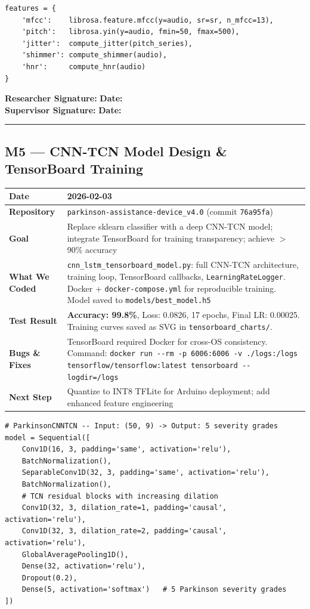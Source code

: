 \documentclass[12pt,a4paper]{article}
\makeatletter
\newcommand{\sigblock}{%
  \vspace{0.6em}
  \noindent\textbf{Researcher Signature:} \underline{\hspace{6cm}} \quad \textbf{Date:} \underline{\hspace{3cm}}\\[0.4em]
  \noindent\textbf{Supervisor Signature:} \underline{\hspace{6cm}} \quad \textbf{Date:} \underline{\hspace{3cm}}
  \vspace{0.4em}\hrule\vspace{0.6em}
}
\newenvironment{milestonetable}{%
  \begin{tcolorbox}[colback=codebg, colframe=codeframe, breakable, left=4pt, right=4pt, top=4pt, bottom=4pt]
  \begin{tabularx}{\linewidth}{@{}>{\bfseries}p{3.2cm} X@{}}
  \toprule
}{%
  \bottomrule
  \end{tabularx}
  \end{tcolorbox}
}
\newcommand{\mrow}[2]{\midrule #1 & #2 \\}
\makeatother
\begin{document}
\begin{lstlisting}[style=pythonstyle, caption={speech\_feature\_extractor.py -- Acoustic feature extraction}]
features = {
    'mfcc':    librosa.feature.mfcc(y=audio, sr=sr, n_mfcc=13),
    'pitch':   librosa.yin(y=audio, fmin=50, fmax=500),
    'jitter':  compute_jitter(pitch_series),
    'shimmer': compute_shimmer(audio),
    'hnr':     compute_hnr(audio)
}
\end{lstlisting}

\sigblock

\subsection{M5 --- CNN-TCN Model Design \& TensorBoard Training}

\begin{milestonetable}
\mrow{Date}{2026-02-03}
\mrow{Repository}{\texttt{parkinson-assistance-device\_v4.0} (commit \texttt{76a95fa})}
\mrow{Goal}{Replace sklearn classifier with a deep CNN-TCN model; integrate TensorBoard for training transparency; achieve $>$90\% accuracy}
\mrow{What We Coded}{\texttt{cnn\_lstm\_tensorboard\_model.py}: full CNN-TCN architecture, training loop, TensorBoard callbacks, \texttt{LearningRateLogger}. Docker + \texttt{docker-compose.yml} for reproducible training. Model saved to \texttt{models/best\_model.h5}}
\mrow{Test Result}{\textbf{Accuracy: 99.8\%}, Loss: 0.0826, 17 epochs, Final LR: 0.00025. Training curves saved as SVG in \texttt{tensorboard\_charts/}.}
\mrow{Bugs \& Fixes}{TensorBoard required Docker for cross-OS consistency. Command: \texttt{docker run -{}-rm -p 6006:6006 -v ./logs:/logs tensorflow/tensorflow:latest tensorboard -{}-logdir=/logs}}
\mrow{Next Step}{Quantize to INT8 TFLite for Arduino deployment; add enhanced feature engineering}
\end{milestonetable}

\begin{lstlisting}[style=pythonstyle, caption={cnn\_lstm\_tensorboard\_model.py -- CNN-TCN architecture}]
# ParkinsonCNNTCN -- Input: (50, 9) -> Output: 5 severity grades
model = Sequential([
    Conv1D(16, 3, padding='same', activation='relu'),
    BatchNormalization(),
    SeparableConv1D(32, 3, padding='same', activation='relu'),
    BatchNormalization(),
    # TCN residual blocks with increasing dilation
    Conv1D(32, 3, dilation_rate=1, padding='causal', activation='relu'),
    Conv1D(32, 3, dilation_rate=2, padding='causal', activation='relu'),
    GlobalAveragePooling1D(),
    Dense(32, activation='relu'),
    Dropout(0.2),
    Dense(5, activation='softmax')   # 5 Parkinson severity grades
])
\end{lstlisting}
\end{document}
